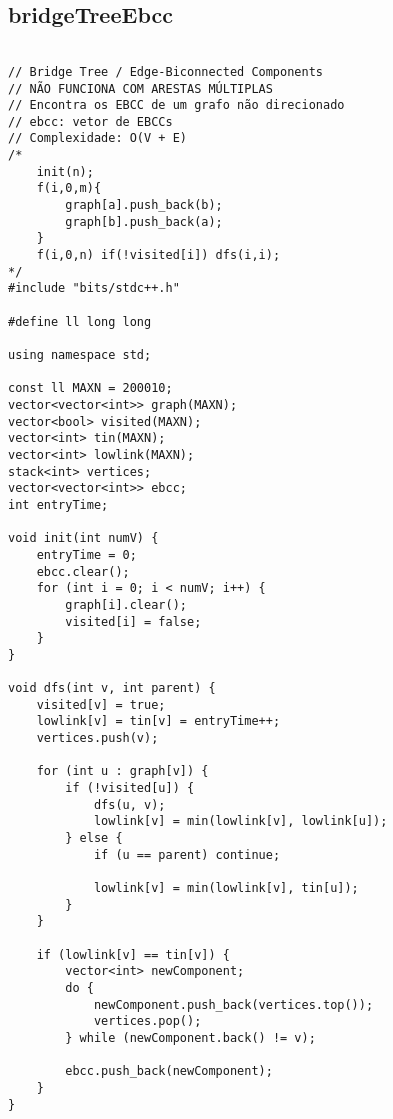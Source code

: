 \documentclass[landscape,twocolumn,10pt,a4paper]{article}
\begin{document}
\subsection{bridgeTreeEbcc}
\begin{verbatim}

// Bridge Tree / Edge-Biconnected Components
// NÃO FUNCIONA COM ARESTAS MÚLTIPLAS
// Encontra os EBCC de um grafo não direcionado
// ebcc: vetor de EBCCs
// Complexidade: O(V + E)
/*
    init(n);
    f(i,0,m){
        graph[a].push_back(b);
        graph[b].push_back(a);
    }
    f(i,0,n) if(!visited[i]) dfs(i,i);
*/
#include "bits/stdc++.h"

#define ll long long

using namespace std;

const ll MAXN = 200010;
vector<vector<int>> graph(MAXN);
vector<bool> visited(MAXN);
vector<int> tin(MAXN);
vector<int> lowlink(MAXN);
stack<int> vertices;
vector<vector<int>> ebcc;
int entryTime;

void init(int numV) {
    entryTime = 0;
    ebcc.clear();
    for (int i = 0; i < numV; i++) {
        graph[i].clear();
        visited[i] = false;
    }
}

void dfs(int v, int parent) {
    visited[v] = true;
    lowlink[v] = tin[v] = entryTime++;
    vertices.push(v); 

    for (int u : graph[v]) {
        if (!visited[u]) {
            dfs(u, v);
            lowlink[v] = min(lowlink[v], lowlink[u]);
        } else {
            if (u == parent) continue;

            lowlink[v] = min(lowlink[v], tin[u]);
        }
    }

    if (lowlink[v] == tin[v]) {
        vector<int> newComponent;
        do {
            newComponent.push_back(vertices.top());
            vertices.pop();
        } while (newComponent.back() != v);

        ebcc.push_back(newComponent);
    }
}


\end{verbatim}
\end{document}
